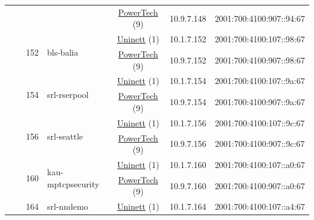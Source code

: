 \begin{small}
\begin{center}
\begin{longtable}{|c|c|c|c|c|c|c|c|}
  &  &  &  & \multicolumn{2}{|c|}{\tiny{\href{http://www.powertech.no}{PowerTech} (9)}} & \tiny{10.9.7.148} & \tiny{2001:700:4100:907::94:67} \\* \cline{3-3}\cline{4-4}\cline{5-5}\cline{6-6}\cline{7-7}\cline{8-8}
  &  & \multirow{2}{*}{\tiny{152}} & \multicolumn{1}{|l|}{\multirow{2}{*}{\tiny{bls-balia}}} & \multicolumn{2}{|c|}{\tiny{\href{https://www.uninett.no}{Uninett} (1)}} & \tiny{10.1.7.152} & \tiny{2001:700:4100:107::98:67} \\* \cline{5-5}\cline{6-6}\cline{7-7}\cline{8-8}
  &  &  &  & \multicolumn{2}{|c|}{\tiny{\href{http://www.powertech.no}{PowerTech} (9)}} & \tiny{10.9.7.152} & \tiny{2001:700:4100:907::98:67} \\* \cline{3-3}\cline{4-4}\cline{5-5}\cline{6-6}\cline{7-7}\cline{8-8}
  &  & \multirow{2}{*}{\tiny{154}} & \multicolumn{1}{|l|}{\multirow{2}{*}{\tiny{srl-rserpool}}} & \multicolumn{2}{|c|}{\tiny{\href{https://www.uninett.no}{Uninett} (1)}} & \tiny{10.1.7.154} & \tiny{2001:700:4100:107::9a:67} \\* \cline{5-5}\cline{6-6}\cline{7-7}\cline{8-8}
  &  &  &  & \multicolumn{2}{|c|}{\tiny{\href{http://www.powertech.no}{PowerTech} (9)}} & \tiny{10.9.7.154} & \tiny{2001:700:4100:907::9a:67} \\* \cline{3-3}\cline{4-4}\cline{5-5}\cline{6-6}\cline{7-7}\cline{8-8}
  &  & \multirow{2}{*}{\tiny{156}} & \multicolumn{1}{|l|}{\multirow{2}{*}{\tiny{srl-seattle}}} & \multicolumn{2}{|c|}{\tiny{\href{https://www.uninett.no}{Uninett} (1)}} & \tiny{10.1.7.156} & \tiny{2001:700:4100:107::9c:67} \\* \cline{5-5}\cline{6-6}\cline{7-7}\cline{8-8}
  &  &  &  & \multicolumn{2}{|c|}{\tiny{\href{http://www.powertech.no}{PowerTech} (9)}} & \tiny{10.9.7.156} & \tiny{2001:700:4100:907::9c:67} \\* \cline{3-3}\cline{4-4}\cline{5-5}\cline{6-6}\cline{7-7}\cline{8-8}
  &  & \multirow{2}{*}{\tiny{160}} & \multicolumn{1}{|l|}{\multirow{2}{*}{\tiny{kau-mptcpsecurity}}} & \multicolumn{2}{|c|}{\tiny{\href{https://www.uninett.no}{Uninett} (1)}} & \tiny{10.1.7.160} & \tiny{2001:700:4100:107::a0:67} \\* \cline{5-5}\cline{6-6}\cline{7-7}\cline{8-8}
  &  &  &  & \multicolumn{2}{|c|}{\tiny{\href{http://www.powertech.no}{PowerTech} (9)}} & \tiny{10.9.7.160} & \tiny{2001:700:4100:907::a0:67} \\* \cline{3-3}\cline{4-4}\cline{5-5}\cline{6-6}\cline{7-7}\cline{8-8}
  &  & \multirow{2}{*}{\tiny{164}} & \multicolumn{1}{|l|}{\multirow{2}{*}{\tiny{srl-nndemo}}} & \multicolumn{2}{|c|}{\tiny{\href{https://www.uninett.no}{Uninett} (1)}} & \tiny{10.1.7.164} & \tiny{2001:700:4100:107::a4:67} \\* \cline{5-5}\cline{6-6}\cline{7-7}\cline{8-8}

\end{longtable}
\end{center}
\end{small}
